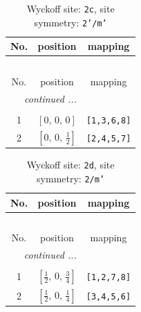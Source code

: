 \documentclass[fleqn,8pt]{jsarticle}
\begin{document}
\renewcommand{\arraystretch}{1.2}
\begin{longtable}{ccc}
\caption{Wyckoff site: {\tt 2c}, site symmetry: {\tt 2'/m'}}
 \\
 \hline \hline
No. & position & mapping \\ \hline \endfirsthead

\multicolumn{2}{l}{\tablename\ \thetable{}} \\
 \hline \hline
No. & position & mapping \\ \hline \endhead

 \hline \hline
\multicolumn{2}{r}{\footnotesize\it continued ...} \\ \endfoot

 \hline \hline
\multicolumn{2}{r}{} \\ \endlastfoot

1 & $\left[ 0,\, 0,\, 0 \right]$ & {\tt [1,3,6,8]} \\ \hline
2 & $\left[ 0,\, 0,\, \frac{1}{2} \right]$ & {\tt [2,4,5,7]} \\
\end{longtable}
\renewcommand{\arraystretch}{1.2}
\begin{longtable}{ccc}
\caption{Wyckoff site: {\tt 2d}, site symmetry: {\tt 2/m'}}
 \\
 \hline \hline
No. & position & mapping \\ \hline \endfirsthead

\multicolumn{2}{l}{\tablename\ \thetable{}} \\
 \hline \hline
No. & position & mapping \\ \hline \endhead

 \hline \hline
\multicolumn{2}{r}{\footnotesize\it continued ...} \\ \endfoot

 \hline \hline
\multicolumn{2}{r}{} \\ \endlastfoot

1 & $\left[ \frac{1}{2},\, 0,\, \frac{3}{4} \right]$ & {\tt [1,2,7,8]} \\ \hline
2 & $\left[ \frac{1}{2},\, 0,\, \frac{1}{4} \right]$ & {\tt [3,4,5,6]} \\
\end{longtable}
\renewcommand{\arraystretch}{1.2}
\end{document}
